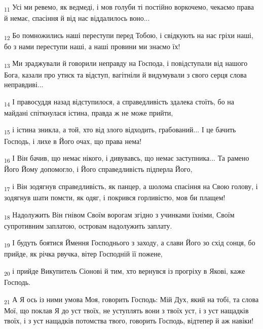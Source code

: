 \begin{tcolorbox}
\textsubscript{11} Усі ми ревемо, як ведмеді, і мов голуби ті постійно воркочемо, чекаємо права й немає, спасіння й від нас віддалилось воно...
\end{tcolorbox}
\begin{tcolorbox}
\textsubscript{12} Бо помножились наші переступи перед Тобою, і свідкують на нас гріхи наші, бо з нами переступи наші, а наші провини ми знаємо їх!
\end{tcolorbox}
\begin{tcolorbox}
\textsubscript{13} Ми зраджували й говорили неправду на Господа, і повідступали від нашого Бога, казали про утиск та відступ, вагітніли й видумували з свого серця слова неправдиві...
\end{tcolorbox}
\begin{tcolorbox}
\textsubscript{14} І правосуддя назад відступилося, а справедливість здалека стоїть, бо на майдані спіткнулася істина, правда ж не може прийти,
\end{tcolorbox}
\begin{tcolorbox}
\textsubscript{15} і істина зникла, а той, хто від злого відходить, грабований... І це бачить Господь, і лихе в Його очах, що права нема!
\end{tcolorbox}
\begin{tcolorbox}
\textsubscript{16} І Він бачив, що немає нікого, і дивувавсь, що немає заступника... Та рамено Його Йому допомогло, і Його справедливість підперла Його,
\end{tcolorbox}
\begin{tcolorbox}
\textsubscript{17} і Він зодягнув справедливість, як панцер, а шолома спасіння на Свою голову, і зодягнув шати помсти, як одяг, і покрився горливістю, мов би плащем!
\end{tcolorbox}
\begin{tcolorbox}
\textsubscript{18} Надолужить Він гнівом Своїм ворогам згідно з учинками їхніми, Своїм супротивним заплатою, островам надолужить заплату.
\end{tcolorbox}
\begin{tcolorbox}
\textsubscript{19} І будуть боятися Ймення Господнього з заходу, а слави Його зо схід сонця, бо прийде, як річка рвучка, вітер Господній її пожене,
\end{tcolorbox}
\begin{tcolorbox}
\textsubscript{20} і прийде Викупитель Сіонові й тим, хто вернувся із прогріху в Якові, каже Господь.
\end{tcolorbox}
\begin{tcolorbox}
\textsubscript{21} А Я ось із ними умова Моя, говорить Господь: Мій Дух, який на тобі, та слова Мої, що поклав Я до уст твоїх, не уступлять вони з твоїх уст, і з уст нащадків твоїх, і з уст нащадків потомства твого, говорить Господь, відтепер й аж навіки!
\end{tcolorbox}
